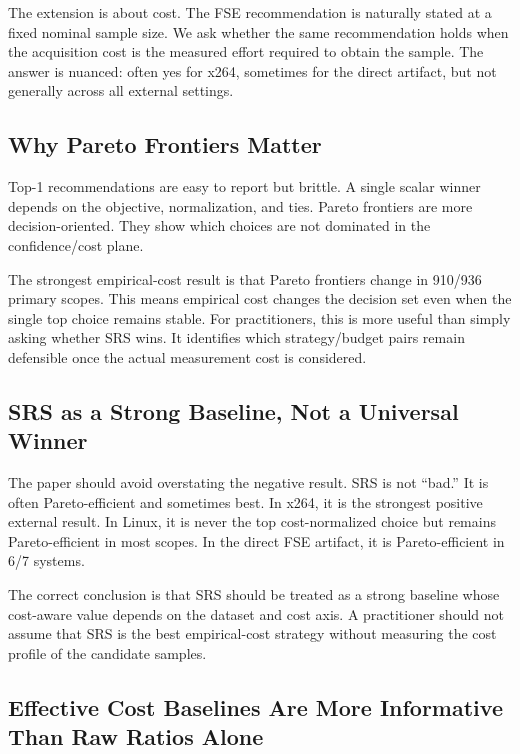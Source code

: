\documentclass[smallcondensed]{svjour3}
\begin{document}
The extension is about cost. The FSE recommendation is naturally stated
at a fixed nominal sample size. We ask whether the same recommendation
holds when the acquisition cost is the measured effort required to
obtain the sample. The answer is nuanced: often yes for x264, sometimes
for the direct artifact, but not generally across all external settings.

\subsection{Why Pareto Frontiers
Matter}\label{why-pareto-frontiers-matter}

Top-1 recommendations are easy to report but brittle. A single scalar
winner depends on the objective, normalization, and ties. Pareto
frontiers are more decision-oriented. They show which choices are not
dominated in the confidence/cost plane.

The strongest empirical-cost result is that Pareto frontiers change in
910/936 primary scopes. This means empirical cost changes the decision
set even when the single top choice remains stable. For practitioners,
this is more useful than simply asking whether SRS wins. It identifies
which strategy/budget pairs remain defensible once the actual
measurement cost is considered.

\subsection{SRS as a Strong Baseline, Not a Universal
Winner}\label{srs-as-a-strong-baseline-not-a-universal-winner}

The paper should avoid overstating the negative result. SRS is not
``bad.'' It is often Pareto-efficient and sometimes best. In x264, it is
the strongest positive external result. In Linux, it is never the top
cost-normalized choice but remains Pareto-efficient in most scopes. In
the direct FSE artifact, it is Pareto-efficient in 6/7 systems.

The correct conclusion is that SRS should be treated as a strong
baseline whose cost-aware value depends on the dataset and cost axis. A
practitioner should not assume that SRS is the best empirical-cost
strategy without measuring the cost profile of the candidate samples.

\subsection{Effective Cost Baselines Are More Informative Than Raw
Ratios
Alone}\label{effective-cost-baselines-are-more-informative-than-raw-ratios-alone}
\end{document}

